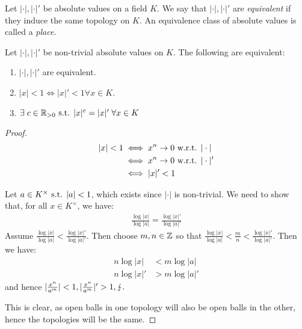 \documentclass[10pt,a4paper]{article}
\begin{document}
\begin{definition}
  Let $|\cdot|, |\cdot|'$ be absolute values on a field $K$. We say that $|\cdot|, |\cdot|'$ are \emph{equivalent} if they induce the same topology on $K$. An equivalence class of absolute values is called a \emph{place}.
\end{definition}

\begin{proposition}
  Let $|\cdot|, |\cdot|'$ be non-trivial absolute values on $K$. The following are equivalent:
  \begin{enumerate}
    \item $|\cdot|, |\cdot|'$ are equivalent.
    \item $|x| < 1 \iff |x|' < 1 \forall x\in K$.
    \item $\exists c \in \R_{>0} \st |x|^c = |x|' \forall x \in K$
  \end{enumerate}
\end{proposition}
\begin{proof}\hspace*{0cm}\\
  \begin{align}
    |x|<1 &\iff x^n \to 0 \text{ w.r.t. } |\cdot|\\
    &\iff x^n \to 0 \text{ w.r.t. } |\cdot|'\\
    &\iff |x|' < 1
  \end{align}

   Let $a \in K^{\times} \text{ s.t. } |a| < 1$, which exists since $|\cdot|$ is non-trivial. We need to show that, for all $x \in K^\times$, we have:
  \begin{align*}
    \frac{\log|x|}{\log|a|} = \frac{\log|x|'}{\log|a|'}
  \end{align*}
  Assume $\frac{\log|x|}{\log|a|} < \frac{\log|x|'}{\log|a|'}$. Then choose $m,n \in \mathbb{Z}$ so that $\frac{\log|x|}{\log|a|} < \frac{m}{n} < \frac{\log|x|'}{\log|a|'}$. Then we have:
  \begin{align*}
    n \log |x| &< m \log |a|\\
    n \log |x|' &> m \log |a|'
  \end{align*}
  and hence $|\frac{x^n}{a^m}| < 1, |\frac{x^n}{a^m}|' > 1, \lightning.$

   This is clear, as open balls in one topology will also be open balls in the other, hence the topologies will be the same.
\end{proof}
\end{document}
